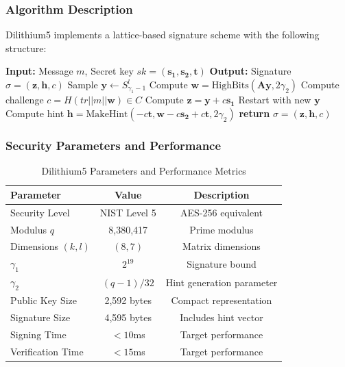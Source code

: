 \documentclass[11pt,a4paper]{article}
\begin{document}
\subsubsection{Algorithm Description}

Dilithium5 implements a lattice-based signature scheme with the following structure:

\begin{algorithm}[H]
\caption{Dilithium5 Signature Generation}
\begin{algorithmic}
\STATE \textbf{Input:} Message $m$, Secret key $sk = (\mathbf{s_1}, \mathbf{s_2}, \mathbf{t})$
\STATE \textbf{Output:} Signature $\sigma = (\mathbf{z}, \mathbf{h}, c)$
\STATE
\STATE Sample $\mathbf{y} \leftarrow S_{\gamma_1 - 1}^l$
\STATE Compute $\mathbf{w} = \text{HighBits}(\mathbf{A}\mathbf{y}, 2\gamma_2)$
\STATE Compute challenge $c = H(tr || m || \mathbf{w}) \in C$
\STATE Compute $\mathbf{z} = \mathbf{y} + c\mathbf{s_1}$
    \STATE Restart with new $\mathbf{y}$
\ENDIF
\STATE Compute hint $\mathbf{h} = \text{MakeHint}(-c\mathbf{t}, \mathbf{w} - c\mathbf{s_2} + c\mathbf{t}, 2\gamma_2)$
\STATE \textbf{return} $\sigma = (\mathbf{z}, \mathbf{h}, c)$
\end{algorithmic}
\end{algorithm}

\subsubsection{Security Parameters and Performance}

\begin{table}[H]
\centering
\caption{Dilithium5 Parameters and Performance Metrics}
\begin{tabular}{|l|c|c|}
\hline
\textbf{Parameter} & \textbf{Value} & \textbf{Description} \\
\hline
Security Level & NIST Level 5 & AES-256 equivalent \\
Modulus $q$ & 8,380,417 & Prime modulus \\
Dimensions $(k,l)$ & $(8,7)$ & Matrix dimensions \\
$\gamma_1$ & $2^{19}$ & Signature bound \\
$\gamma_2$ & $(q-1)/32$ & Hint generation parameter \\
\hline
Public Key Size & 2,592 bytes & Compact representation \\
Signature Size & 4,595 bytes & Includes hint vector \\
Signing Time & $<10$ms & Target performance \\
Verification Time & $<15$ms & Target performance \\
\hline
\end{tabular}
\label{tab:dilithium-params}
\end{table}
\end{document}
